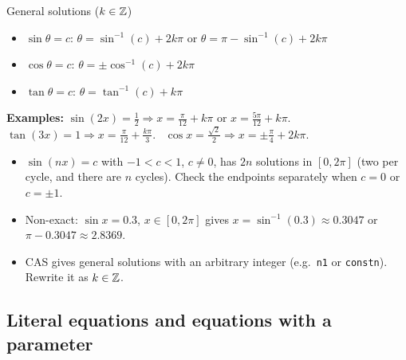 \begin{cols}
\begin{keyres}{General solutions ($k\in\mathbb{Z}$)}
\begin{itemize}
  \item $\sin\theta=c$: $\theta=\sin^{-1}(c)+2k\pi$ or $\theta=\pi-\sin^{-1}(c)+2k\pi$
  \item $\cos\theta=c$: $\theta=\pm\cos^{-1}(c)+2k\pi$
  \item $\tan\theta=c$: $\theta=\tan^{-1}(c)+k\pi$
\end{itemize}
\textbf{Examples:} $\sin(2x)=\frac12\Rightarrow x=\frac{\pi}{12}+k\pi$ or $x=\frac{5\pi}{12}+k\pi$. \ $\tan(3x)=1\Rightarrow x=\frac{\pi}{12}+\frac{k\pi}{3}$. \ $\cos x=\frac{\sqrt2}{2}\Rightarrow x=\pm\frac{\pi}{4}+2k\pi$.
\end{keyres}
\nextcol
\begin{tip}
\begin{itemize}
  \item $\sin(nx)=c$ with $-1<c<1$, $c\ne0$, has $2n$ solutions in $[0,2\pi]$ (two per cycle, and there are $n$ cycles). Check the endpoints separately when $c=0$ or $c=\pm1$.
  \item Non-exact: $\sin x=0.3$, $x\in[0,2\pi]$ gives $x=\sin^{-1}(0.3)\approx0.3047$ or $\pi-0.3047\approx2.8369$.
  \item CAS gives general solutions with an arbitrary integer (e.g.\ \texttt{n1} or \texttt{constn}). Rewrite it as $k\in\mathbb{Z}$.
\end{itemize}
\end{tip}
\end{cols}

\subsection{Literal equations and equations with a parameter}
\label{sec:literal}

